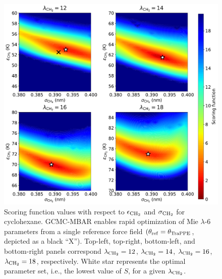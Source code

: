 \documentclass[journal=jced,manuscript=article]{achemso}
\begin{document}
	\begin{figure}[htb!]
		\centering
		\includegraphics[width=6.4in]{CYC6_scoring_function_lam.pdf}
		\caption{Scoring function values with respect to $\epsilon_{\rm CH_2}$ and $\sigma_{\rm CH_2}$ for cyclohexane. GCMC-MBAR enables rapid optimization of Mie $\lambda$-6 parameters from a single reference force field $(\theta_{\rm ref} = \theta_{\rm TraPPE}$, depicted as a black ``X''). Top-left, top-right, bottom-left, and bottom-right panels correspond $\lambda_{\rm CH_2} = 12$, $\lambda_{\rm CH_2} = 14$, $\lambda_{\rm CH_2} = 16$, $\lambda_{\rm CH_2} = 18$, respectively. White star represents the optimal parameter set, i.e., the lowest value of $S$, for a given $\lambda_{\rm CH_2}$.} %
		\label{fig:Score_CYC6}
	\end{figure} 
\end{document}
